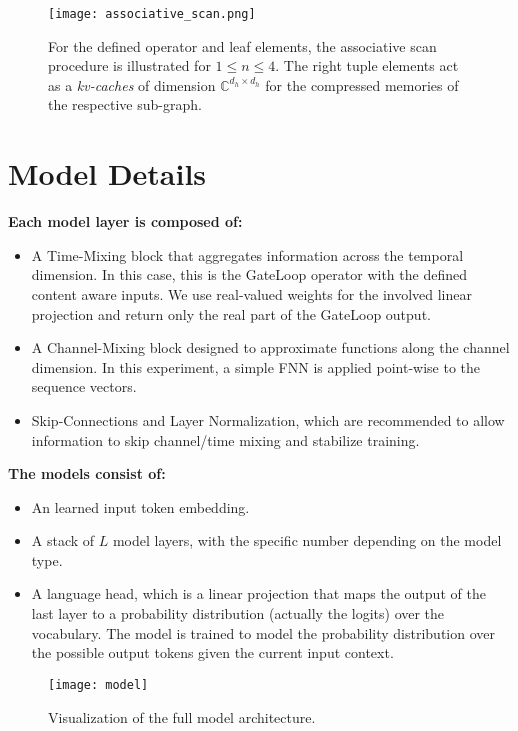 \documentclass{article} \usepackage{iclr2024_conference,times}
\begin{document}
\begin{figure}[H]
\begin{center}
\texttt{[image: associative\_scan.png]}
\end{center}
\caption{For the defined operator and leaf elements, the associative scan procedure is illustrated for $1 \leq n \leq 4$. The right tuple elements act as a \textit{kv-caches} of dimension $\mathbb{C}^{d_h \times d_h}$ for the compressed memories of the respective sub-graph.}
\label{fig:associative_scan}
\end{figure}

\newpage


\section{Model Details}\label{sec:model}

\textbf{Each model layer is composed of:}
\begin{itemize}
\item A Time-Mixing block that aggregates information across the temporal dimension. In this case, this is the GateLoop operator with the defined content aware inputs. We use real-valued weights for the involved linear projection and return only the real part of the GateLoop output. 
\item A Channel-Mixing block designed to approximate functions along the channel dimension. In this experiment, a simple FNN is applied point-wise to the sequence vectors.
\item Skip-Connections and Layer Normalization, which are recommended to allow information to skip channel/time mixing and stabilize training.
\end{itemize}
\textbf{The models consist of:}
\begin{itemize}
\item An learned input token embedding.
\item A stack of $L$ model layers, with the specific number depending on the model type.
\item A language head, which is a linear projection that maps the output of the last layer to a probability distribution (actually the logits) over the vocabulary. The model is trained to model the probability distribution over the possible output tokens given the current input context.
\end{itemize}

\begin{figure}[H]
\centering
\texttt{[image: model]}
\caption{Visualization of the full model architecture.}
\end{figure}
\end{document}
